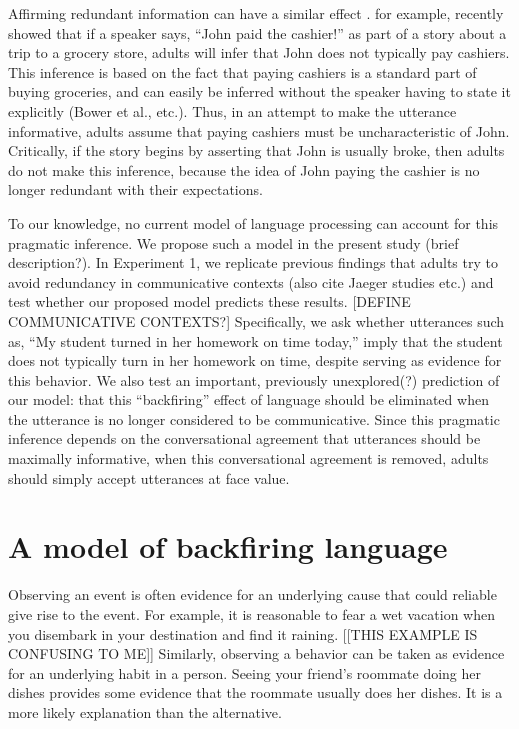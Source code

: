 \documentclass[10pt,letterpaper]{article}
\begin{document}
Affirming redundant information can have a similar effect \cite{Gruenfeld1992, Kravtchenko2015}.  
 for example, recently showed that if a speaker says, “John paid the cashier!” as part of a story about a trip to a grocery store, adults will infer that John does not typically pay cashiers.  This inference is based on the fact that paying cashiers is a standard part of buying groceries, and can easily be inferred without the speaker having to state it explicitly (Bower et al., etc.).  Thus, in an attempt to make the utterance informative, adults assume that paying cashiers must be uncharacteristic of John.  Critically, if the story begins by asserting that John is usually broke, then adults do not make this inference, because the idea of John paying the cashier is no longer redundant with their expectations.

To our knowledge, no current model of language processing can account for this pragmatic inference.  We propose such a model in the present study (brief description?).  In Experiment 1, we replicate previous findings that adults try to avoid redundancy in communicative contexts \cite{Kravtchenko2015} (also cite Jaeger studies etc.) and test whether our proposed model predicts these results.  [DEFINE COMMUNICATIVE CONTEXTS?] Specifically, we ask whether utterances such as, “My student turned in her homework on time today,” imply that the student does not typically turn in her homework on time, despite serving as evidence for this behavior.  We also test an important, previously unexplored(?) prediction of our model: that this “backfiring” effect of language should be eliminated when the utterance is no longer considered to be communicative.  Since this pragmatic inference depends on the conversational agreement that utterances should be maximally informative, when this conversational agreement is removed, adults should simply accept utterances at face value.



\section{A model of backfiring language}

Observing an event is often evidence for an underlying cause that could reliable give rise to the event.
For example, it is reasonable to fear a wet vacation when you disembark in your destination and find it raining.  [[THIS EXAMPLE IS CONFUSING TO ME]]
Similarly, observing a behavior can be taken as evidence for an underlying habit in a person. 
Seeing your friend's roommate doing her dishes provides some evidence that the roommate usually does her dishes. 
It is a more likely explanation than the alternative.
\end{document}
